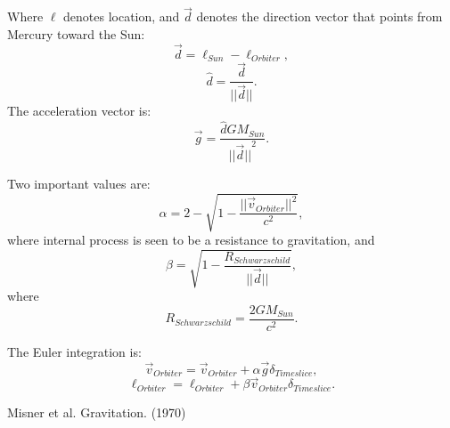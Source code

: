 \documentclass[12pt]{article}
\begin{document}
Where $\ell$ denotes location, and $\vec{d}$ denotes the direction vector that points from Mercury toward the Sun:
\begin{equation}
\vec{d} = \ell_{Sun} - \ell_{Orbiter},	
\end{equation}
\begin{equation}
\hat{d} = \frac{\vec{d}}{\lvert\lvert \vec{d} \rvert\rvert}.
\end{equation}
The acceleration vector is:
\begin{equation}
\vec{g} =  \frac{\hat{d} G M_{Sun}}{{\lvert\lvert \vec{d} \rvert\rvert}^2}.
\end{equation}



Two important values are:
\begin{equation}
\alpha = 2 - \sqrt{1 - \frac{\lvert\lvert \vec{v}_{Orbiter}\rvert\rvert^2}{c^2}},
\end{equation}
where internal process is seen to be a resistance to gravitation, and
\begin{equation}
\beta = \sqrt{1 - \frac{R_{Schwarzschild}}{\lvert \lvert \vec{d} \rvert \rvert}},
\end{equation}
where
\begin{equation}
R_{Schwarzschild} = \frac{2GM_{Sun}}{c^2}.
\end{equation}



The Euler integration is:
\begin{equation}
\vec{v}_{Orbiter} = \vec{v}_{Orbiter} + \alpha \vec{g} \delta_{Timeslice},
\end{equation}
\begin{equation}
\ell_{Orbiter} = \ell_{Orbiter} + \beta \vec{v}_{Orbiter} \delta_{Timeslice}.
\end{equation}






\begin{thebibliography}{9}


 Misner et al. Gravitation. (1970)






\end{thebibliography}
\end{document}
